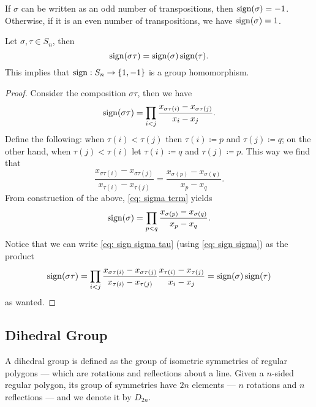 \begin{corollary}
If \(\sigma\) can be written as an odd number of transpositions, then
\(\operatorname{sign}(\sigma) = -1\). Otherwise, if it is an even number of
transpositions, we have \(\operatorname{sign}(\sigma) = 1\).
\end{corollary}

\begin{proposition}\label{prop: sign is a group homomorphism}
Let \(\sigma, \tau \in S_n\), then
\[
  \operatorname{sign}(\sigma \tau) = \operatorname{sign}(\sigma)
  \operatorname{sign}(\tau).
\]
This implies that \(\operatorname{sign}: S_n \to \{1, -1\}\) is a
group homomorphism.
\end{proposition}

\begin{proof}
Consider the composition \(\sigma \tau\), then we have
\begin{equation}\label{eq: sign sigma tau}
    \operatorname{sign}(\sigma \tau) = \prod_{i < j} \frac{x_{\sigma\tau(i)} -
    x_{\sigma\tau(j)}}{x_i - x_j}.
\end{equation}
Define the following: when \(\tau(i) < \tau(j)\) then \(\tau(i) \coloneq p\) and
\(\tau(j) \coloneq q\); on the other hand, when \(\tau(j) < \tau(i)\) let \(\tau(i)
\coloneq q\) and \(\tau(j) \coloneq p\). This way we find that
\begin{equation}\label{eq: sigma term}
  \frac{x_{\sigma\tau(i)} - x_{\sigma\tau(j)}}{x_{\tau(i)} - x_{\tau(j)}}
  = \frac{x_{\sigma(p)} - x_{\sigma(q)}}{x_p - x_q}.
\end{equation}
From construction of the above, \cref{eq: sigma term} yields
\begin{equation}\label{eq: sign sigma}
  \operatorname{sign}(\sigma) = \prod_{p < q} \frac{x_{\sigma(p)} -
  x_{\sigma(q)}}{x_p - x_q}.
\end{equation}
Notice that we can write \cref{eq: sign sigma tau} (using \cref{eq: sign
sigma}) as the product
\[
  \operatorname{sign}(\sigma \tau) = \prod_{i < j}
  \frac{x_{\sigma \tau(i)} - x_{\sigma \tau(j)}}{x_{\tau(i)} - x_{\tau(j)}}
  \frac{x_{\tau(i)} - x_{\tau(j)}}{x_i - x_j}
  = \operatorname{sign}(\sigma) \operatorname{sign}(\tau)
\]
as wanted.
\end{proof}

\subsection{Dihedral Group}

\begin{definition}\label{def: dihedral}
A dihedral group is defined as the group of isometric symmetries of regular
polygons --- which are rotations and reflections about a line. Given a
\(n\)-sided regular polygon, its group of symmetries have \(2n\) elements ---
\(n\) rotations and \(n\) reflections --- and we denote it by \(D_{2n}\).
\end{definition}

